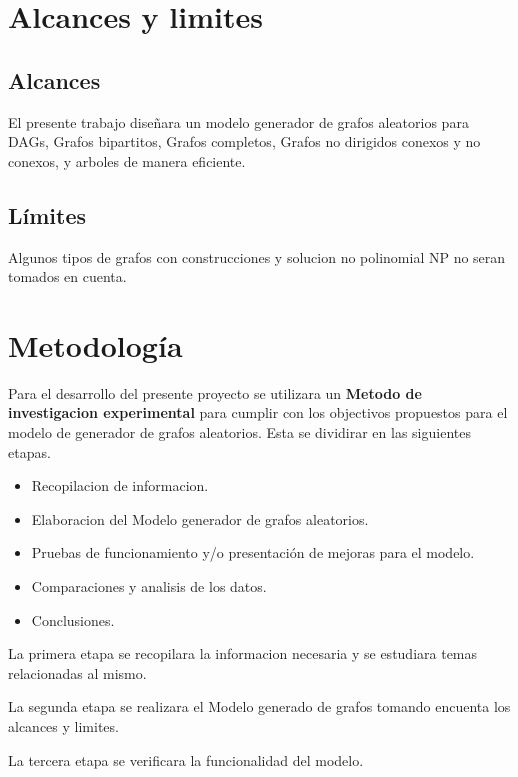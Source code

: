 \documentclass[11pt]{extarticle}
\begin{document}
\section{Alcances y limites}
  \subsection{Alcances}
    \begin{itemize}
      \guion El presente trabajo diseñara un modelo generador de grafos aleatorios
            para DAGs, Grafos bipartitos, Grafos completos, Grafos no dirigidos
            conexos y no conexos, y arboles de manera eficiente.
      \end{itemize}
  \subsection{L\'imites}
    \begin{itemize}
      \guion Algunos tipos de grafos con construcciones y solucion no polinomial NP no seran tomados en cuenta.
    \end{itemize}

\section{Metodolog\'ia}
  Para el desarrollo del presente proyecto se utilizara un 
  \textbf{Metodo de investigacion experimental} para cumplir con los 
    objectivos propuestos para el modelo de generador de grafos aleatorios. 
    Esta se dividirar en las siguientes etapas.
    \begin{itemize}
      \item Recopilacion de informacion.
      \item Elaboracion del Modelo generador de grafos aleatorios.
      \item Pruebas de funcionamiento y/o presentación de mejoras para el modelo.
      \item Comparaciones y analisis de los datos.
      \item Conclusiones.
    \end{itemize}
    
    La primera etapa se recopilara la informacion necesaria y
    se estudiara temas relacionadas al mismo.\hfill\break

    La segunda etapa se realizara el Modelo generado de grafos tomando
    encuenta los alcances y limites. \hfill\break

    La tercera etapa se verificara la funcionalidad del modelo.
    \hfill\break
\end{document}
